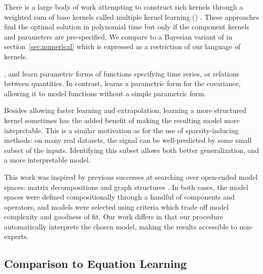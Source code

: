 There is a large body of work attempting to construct rich kernels through a weighted sum of base kernels called multiple kernel learning (\MKL{}) \citep[e.g.][]{bach2004multiple}.
These approaches find the optimal solution in polynomial time but only if the component kernels and parameters are pre-specified.
We compare to a Bayesian variant of \MKL{} in section~\ref{sec:numerical} which is expressed as a restriction of our language of kernels.

\cite{todorovski1997declarative}, \cite{washio1999discovering} and \cite{Schmidt2009b} learn parametric forms of functions specifying time series, or relations between quantities.
In contrast, \procedurename{} learns a parametric form for the covariance, allowing it to model functions without a simple parametric form.





Besides allowing faster learning and extrapolation, learning a more structured kernel sometimes has the added benefit of making the resulting model more intepretable.
This is a similar motivation as for the use of sparsity-inducing methods: on many real datasets, the signal can be well-predicted by some small subset of the inputs.
Identifying this subset allows both better generalization, and a more interpretable model.



This work was inspired by previous successes at searching over open-ended model spaces: matrix decompositions \citep{grosse2012exploiting} and graph structures \citep{kemp2008discovery}.
In both cases, the model spaces were defined compositionally through a handful of components and operators, and models were selected using criteria which trade off model complexity and goodness of fit.
Our work differs in that our procedure automatically interprets the chosen model, making the results accessible to non-experts.




\subsection{Comparison to Equation Learning}
\label{sec:eqn-learning-comp}

